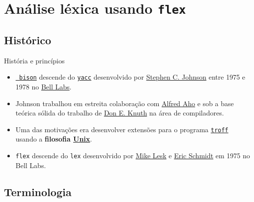 \frame{\title{\insertlecture}\maketitle}

\section{Análise léxica usando {\tt flex}}

\frame{\tableofcontents}

\subsection{Histórico}

\begin{frame}{História e princípios}
  \begin{itemize}
  \item{\color{gray!70!black}\href{https://www.gnu.org/software/bison/}{\tt
      bison} descende do
    \href{(https://pt.wikipedia.org/wiki/Yacc}{\tt yacc} desenvolvido
    por
    \href{https://en.wikipedia.org/wiki/Stephen_C._Johnson}{Stephen
      C. Johnson} entre 1975 e 1978 no
    \href{https://pt.wikipedia.org/wiki/Bell_Labs}{Bell Labs}.}
  \item Johnson trabalhou em estreita colaboração com
    \href{https://en.wikipedia.org/wiki/Alfred_Aho}{Alfred Aho}
    e sob a base teórica sólida do trabalho de
    \href{https://www-cs-faculty.stanford.edu/~knuth/}{Don E. Knuth}
    na área de compiladores.
  \item Uma das motivações era desenvolver extensões para o
    programa \href{https://en.wikipedia.org/wiki/Troff}{\tt troff}
    usando a {\bf filosofia
    \href{https://en.wikipedia.org/wiki/Unix_philosophy}{Unix}}.
  \item \alert{\tt flex} descende do \alert{\tt lex} desenvolvido por
    \href{https://en.wikipedia.org/wiki/Mike_Lesk}{Mike Lesk}
    e \href{https://en.wikipedia.org/wiki/Eric_Schmidt}{Eric Schmidt}
    em 1975 no Bell Labs.
  \end{itemize}
\end{frame}

\subsection{Terminologia}

